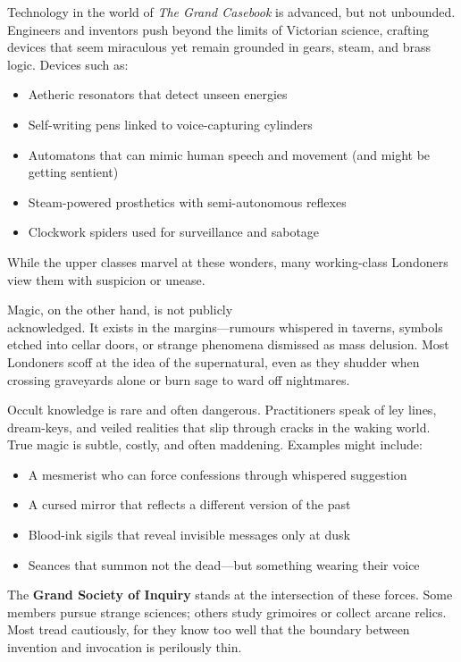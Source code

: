 Technology in the world of \textit{The Grand Casebook} is advanced, but not unbounded. Engineers and inventors push beyond the limits of Victorian science, crafting devices that seem miraculous yet remain grounded in gears, steam, and brass logic. Devices such as:
\begin{itemize}
    \item Aetheric resonators that detect unseen energies
    \item Self-writing pens linked to voice-capturing cylinders
    \item Automatons that can mimic human speech and movement (and might be getting sentient)
    \item Steam-powered prosthetics with semi-autonomous reflexes
    \item Clockwork spiders used for surveillance and sabotage
\end{itemize}
While the upper classes marvel at these wonders, many working-class Londoners view them with suspicion or unease.

Magic, on the other hand, is not publicly\\ acknowledged. It exists in the margins—rumours whispered in taverns, symbols etched into cellar doors, or strange phenomena dismissed as mass delusion. Most Londoners scoff at the idea of the supernatural, even as they shudder when crossing graveyards alone or burn sage to ward off nightmares.

Occult knowledge is rare and often dangerous. Practitioners speak of ley lines, dream-keys, and veiled realities that slip through cracks in the waking world. True magic is subtle, costly, and often maddening. Examples might include:
\begin{itemize}
    \item A mesmerist who can force confessions through whispered suggestion
    \item A cursed mirror that reflects a different version of the past
    \item Blood-ink sigils that reveal invisible messages only at dusk
    \item Seances that summon not the dead—but something wearing their voice
\end{itemize}

The \textbf{Grand Society of Inquiry} stands at the intersection of these forces. Some members pursue strange sciences; others study grimoires or collect arcane relics. Most tread cautiously, for they know too well that the boundary between invention and invocation is perilously thin.

